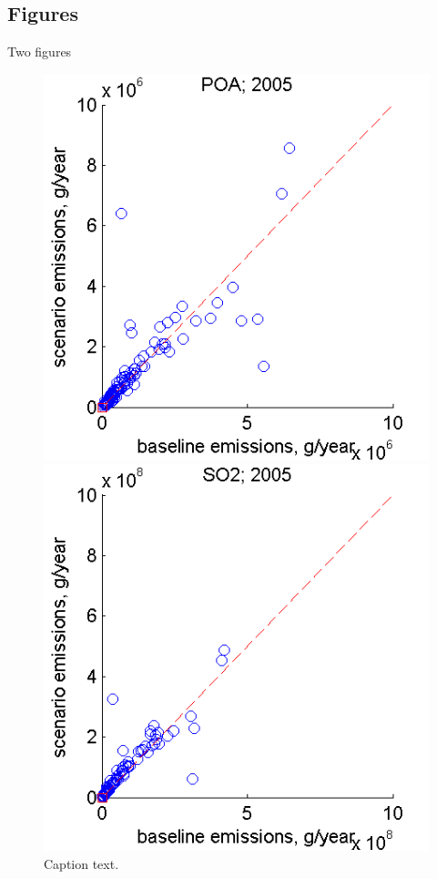 \documentclass{beamer}	%
\begin{document}
\subsection{Figures}
\begin{frame}{Two figures}

\begin{figure}[ht]
	\begin{minipage}[b]{0.45\linewidth} 
		\centering
		\includegraphics[width=\textwidth]{images/filename1}
		\caption{Caption text.}
		\label{fig:figure1}
	\end{minipage}
	\hspace{0.5cm}
	\begin{minipage}[b]{0.45\linewidth}
		\centering
		\includegraphics[width=\textwidth]{images/filename2}

\end{minipage}
\end{figure}
\end{frame}
\end{document}
